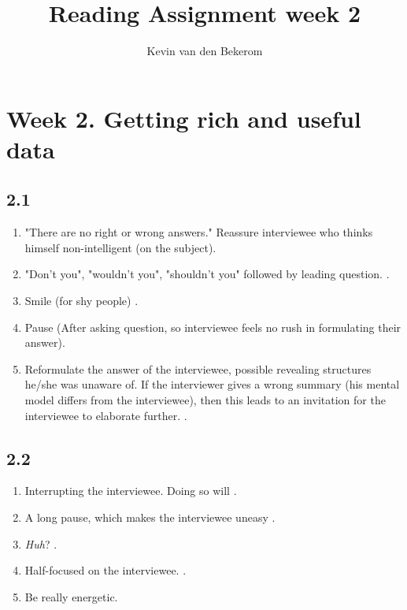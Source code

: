 

\title{Reading Assignment week 2}
\newcommand{\TitelAbbr}{}
\newcommand{\Version}{0.1}



\what{}
\supervisors{}
\author{Kevin van den Bekerom}




\maketitle

\clearpage

\chapter*{Week 2. Getting rich and useful data}

\section*{2.1}

\begin{enumerate}
	\item "There are no right or wrong answers." Reassure interviewee who thinks himself non-intelligent (on the subject).  \cite{nisha}
	\item "Don't you", "wouldn't you", "shouldn't you" followed by leading question. \cite{nisha}.
	\item Smile (for shy people) \cite{nisha}.
	\item Pause (After asking question, so interviewee feels no rush in formulating their answer). \cite{nisha}
	\item Reformulate the answer of the interviewee, possible revealing structures he/she was unaware of. If the interviewer gives a wrong summary (his mental model differs from the interviewee), then this leads to an invitation for the interviewee to elaborate further.  \cite{apprenticing}.
\end{enumerate}

\section*{2.2}

\begin{enumerate}
	\item Interrupting the interviewee. Doing so will  \cite{medical}.
	\item A long pause, which makes the interviewee uneasy \cite{nisha}.
	\item \textit{Huh}?  \cite{apprenticing}.
	\item Half-focused on the interviewee. \cite{medical}.
	\item Be really energetic. \cite{nisha} 
\end{enumerate}

